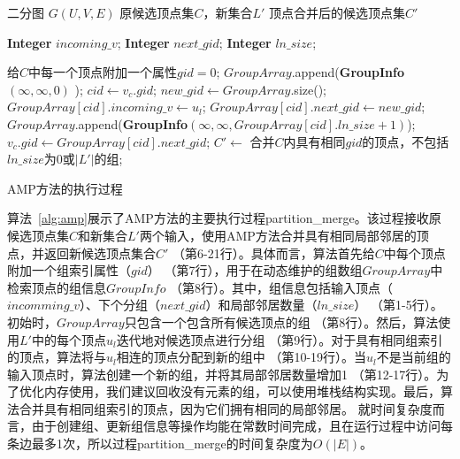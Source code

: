 \begin{algorithm}[t]
  \begin{algorithmic}[1]
    \normalsize
    \renewcommand{\algorithmicrequire}{\textbf{数据:}}
    \REQUIRE 二分图 $G(U,V,E)$
    \renewcommand{\algorithmicrequire}{\textbf{输入:}}
    \REQUIRE 原候选顶点集$C$，新集合$L'$
    \ENSURE 顶点合并后的候选顶点集$C'$
    
    \renewcommand{\algorithmicwhile}{\textbf{struct}}
    \renewcommand{\algorithmicdo}{\textbf{:}}
      \STATE \textbf{Integer} $incoming\_v$;
      \STATE \textbf{Integer} $next\_gid$;
      \STATE \textbf{Integer} $ln\_size$;
    \ENDWHILE


    \renewcommand{\algorithmicwhile}{\textbf{procedure}}
    \renewcommand{\algorithmicdo}{\textbf{do}}


    \STATE 给$C$中每一个顶点附加一个属性$gid=0$;
    \STATE $GroupArray$\textsf{.append}(\textbf{GroupInfo}$(\infty, \infty, 0)$ );
        \STATE $cid \leftarrow v_c.gid$;
          \STATE $new\_gid \leftarrow GroupArray$\textsf{.size()};
          \STATE $GroupArray[cid].incoming\_v \leftarrow u_l$;
          \STATE $GroupArray[cid].next\_gid \leftarrow new\_gid$;
          \STATE $GroupArray$\textsf{.append}(\textbf{GroupInfo$(\infty, \infty, GroupArray[cid].ln\_size + 1)$});
        \ENDIF
      \STATE $v_c.gid\leftarrow GroupArray[cid].next\_gid$; 
      \ENDFOR
    \ENDFOR
    \STATE $C'\leftarrow$ 合并$C$内具有相同$gid$的顶点，不包括$ln\_size$为0或$|L'|$的组;

    \ENDWHILE

  \end{algorithmic}
  \caption{\label{alg:amp}AMP方法的执行过程}
\end{algorithm}

算法~\ref{alg:amp}展示了AMP方法的主要执行过程\textsf{partition\_merge}。该过程接收原候选顶点集$C$和新集合$L'$两个输入，使用AMP方法合并具有相同局部邻居的顶点，并返回新候选顶点集合$C'$ （第6-21行）。具体而言，算法首先给$C$中每个顶点附加一个组索引属性（$gid$） （第7行），用于在动态维护的组数组$GroupArray$中检索顶点的组信息$GroupInfo$ （第8行）。其中，组信息包括输入顶点（$incomming\_v$）、下个分组（$next\_gid$）和局部邻居数量（$ln\_size$） （第1-5行）。初始时，$GroupArray$只包含一个包含所有候选顶点的组 （第8行）。然后，算法使用$L'$中的每个顶点$u_l$迭代地对候选顶点进行分组 （第9行）。对于具有相同组索引的顶点，算法将与$u_l$相连的顶点分配到新的组中 （第10-19行）。当$u_l$不是当前组的输入顶点时，算法创建一个新的组，并将其局部邻居数量增加1 （第12-17行）。为了优化内存使用，我们建议回收没有元素的组，可以使用堆栈结构实现。最后，算法合并具有相同组索引的顶点，因为它们拥有相同的局部邻居。
就时间复杂度而言，由于创建组、更新组信息等操作均能在常数时间完成，且在运行过程中访问每条边最多1次，所以过程\textsf{partition\_merge}的时间复杂度为$O(|E|)$。

